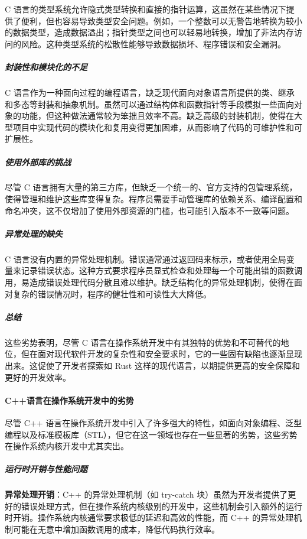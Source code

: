 C 语言的类型系统允许隐式类型转换和直接的指针运算，这虽然在某些情况下提供了便利，但也容易导致类型安全问题。例如，一个整数可以无警告地转换为较小的数据类型，造成数据溢出；指针类型之间也可以轻易地转换，增加了非法内存访问的风险。这种类型系统的松散性能够导致数据损坏、程序错误和安全漏洞。

\subparagraph{封装性和模块化的不足}

C 语言作为一种面向过程的编程语言，缺乏现代面向对象语言所提供的类、继承和多态等封装和抽象机制。虽然可以通过结构体和函数指针等手段模拟一些面向对象的功能，但这种做法通常较为笨拙且效率不高。缺乏高级的封装机制，使得在大型项目中实现代码的模块化和复用变得更加困难，从而影响了代码的可维护性和可扩展性。

\subparagraph{使用外部库的挑战}

尽管 C 语言拥有大量的第三方库，但缺乏一个统一的、官方支持的包管理系统，使得管理和维护这些库变得复杂。程序员需要手动管理库的依赖关系、编译配置和命名冲突，这不仅增加了使用外部资源的门槛，也可能引入版本不一致等问题。

\subparagraph{异常处理的缺失}

C 语言没有内置的异常处理机制。错误通常通过返回码来标示，或者使用全局变量来记录错误状态。这种方式要求程序员显式检查和处理每一个可能出错的函数调用，易造成错误处理代码分散且难以维护。缺乏结构化的异常处理机制，使得在面对复杂的错误情况时，程序的健壮性和可读性大大降低。

\subparagraph{总结}

这些劣势表明，尽管 C 语言在操作系统开发中有其独特的优势和不可替代的地位，但在面对现代软件开发的复杂性和安全要求时，它的一些固有缺陷也逐渐显现出来。这促使了开发者探索如 Rust 这样的现代语言，以期提供更高的安全保障和更好的开发效率。

\paragraph{C++语言在操作系统开发中的劣势}

尽管 C++ 语言在操作系统开发中引入了许多强大的特性，如面向对象编程、泛型编程以及标准模板库（STL），但它在这一领域也存在一些显著的劣势，这些劣势在操作系统内核开发中尤其突出。

\subparagraph{运行时开销与性能问题}

\textbf{异常处理开销}：C++ 的异常处理机制（如 try-catch 块）虽然为开发者提供了更好的错误处理方式，但在操作系统内核级别的开发中，这些机制会引入额外的运行时开销。操作系统内核通常要求极低的延迟和高效的性能，而 C++ 的异常处理机制可能在无意中增加函数调用的成本，降低代码执行效率。

